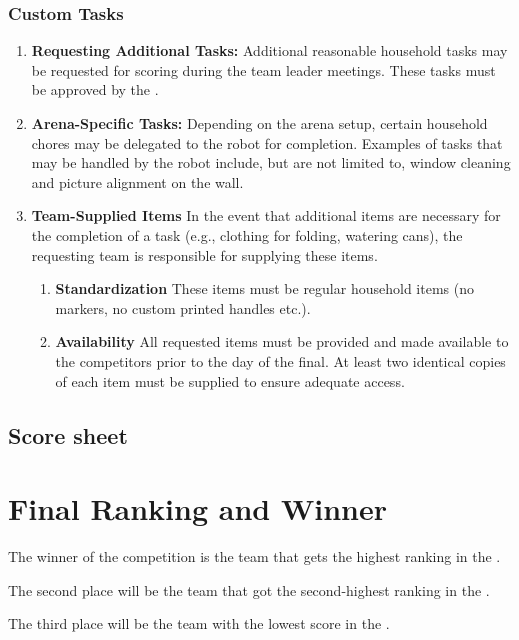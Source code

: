 \subsubsection{Custom Tasks}
\begin{enumerate}[nosep]
\item \textbf{Requesting Additional Tasks:} Additional reasonable household tasks may be requested for scoring during the team leader meetings. These tasks must be approved by the \TC{}.

\item \textbf{Arena-Specific Tasks:} Depending on the arena setup, certain household chores may be delegated to the robot for completion. Examples of tasks that may be handled by the robot include, but are not limited to, window cleaning and picture alignment on the wall.

\item \textbf{Team-Supplied Items} In the event that additional items are necessary for the completion of a task (e.g., clothing for folding, watering cans), the requesting team is responsible for supplying these items.
\begin{enumerate}[nosep]
  \item \textbf{Standardization} These items must be regular household items (no markers, no custom printed handles etc.).
  \item \textbf{Availability} All requested items must be provided and made available to the competitors prior to the day of the final. At least two identical copies of each item must be supplied to ensure adequate access.
\end{enumerate}
\end{enumerate}

\subsection*{Score sheet}


\section{Final Ranking and Winner}

The winner of the competition is the team that gets the highest ranking in the .

The second place will be the team that got the second-highest ranking in the .

The third place will be the team with the lowest score in the .


